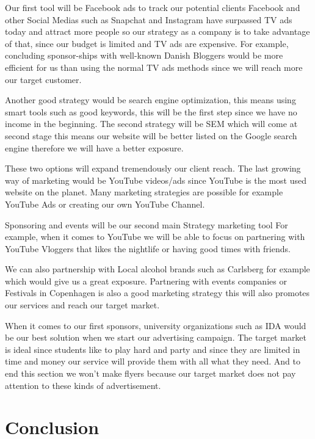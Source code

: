\documentclass[12p]{article}
\begin{document}
Our first tool will be Facebook ads to track our potential clients Facebook and other Social Medias such as Snapchat and Instagram have surpassed TV ads today and attract more people so our strategy as a company is to take advantage of that, since our budget is limited and TV ads are expensive. 
For example, concluding sponsor-ships with well-known Danish Bloggers would be more efficient for us than using the normal TV ads methods since we will reach more our target customer.

Another good strategy would be search engine optimization, this means using smart tools such as good keywords, this will be the first step since we have no income in the beginning.
The second strategy will be SEM which will come at second stage this means our website will be better listed on the Google search engine therefore we will have a better exposure.

These two options will expand tremendously our client reach.
The last growing way of marketing would be YouTube videos/ads since YouTube is the most used website on the planet.
Many marketing strategies are possible for example YouTube Ads or creating our own YouTube Channel.

Sponsoring and events will be our second main Strategy marketing tool
For example, when it comes to YouTube we will be able to focus on partnering with YouTube Vloggers that likes the nightlife or having good times with friends.

We can also partnership with Local alcohol brands such as Carlsberg for example which would give us a great exposure.
Partnering with events companies or Festivals in Copenhagen is also a good marketing strategy this will also promotes our services and reach our target market.

When it comes to our first sponsors, university organizations such as IDA would be our best solution when we start our advertising campaign.
The target market is ideal since students like to play hard and party and since they are limited in time and money our service will provide them with all what they need. And to end this section we won’t make flyers because our target market does not pay attention to these kinds of advertisement.

\newpage


\newpage
\section{Conclusion}


\newpage
\printbibliography

\end{document}
